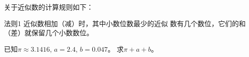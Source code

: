 关于近似数的计算规则如下：
\begin{blk}{法则1}
    近似数相加（减）时，其中小数位数最少的近似
    数有几个数位，它们的和（差）就保留几个小数数位。  
\end{blk}

\begin{example}
    已知$\pi\approx 3.1416$, $a=2.4$, $b=0.047$。
求$\pi+a+b$。
\end{example}    

\begin{solution}



    
\end{solution}

\begin{example}
    
\end{example}
    
\begin{example}
    
\end{example}
    
\begin{solution}
    
\end{solution}
\begin{example}
    
\end{example}



\begin{solution}
    
\end{solution}

\begin{example}
    
\end{example}

\begin{solution}
    
\end{solution}
    
\begin{example}
    
\end{example}

\begin{solution}
    
\end{solution}

\begin{example}
    
\end{example}

